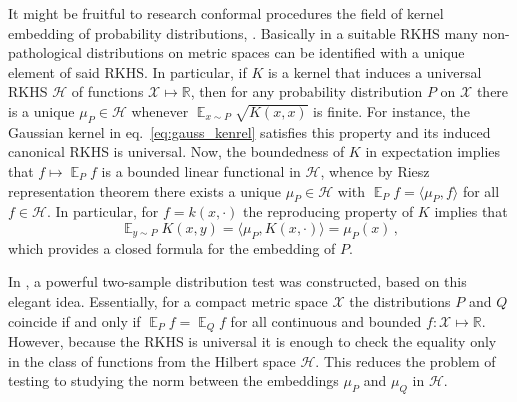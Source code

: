 \documentclass[a4paper,14pt]{extarticle}
\newcommand{\ex}{\mathop{\mathbb{E}}\nolimits}
\newcommand{\Hcal}{\mathcal{H}}
\newcommand{\Xcal}{\mathcal{X}}
\newcommand{\Real}{\mathbb{R}}
\begin{document}
It might be fruitful to research conformal procedures the field of kernel embedding
of probability distributions, \cite{smola2007}. Basically in a suitable RKHS many non-
pathological distributions on metric spaces can be identified with a unique element
of said RKHS. In particular, if $K$ is a kernel that induces a universal RKHS $\Hcal$
of functions $\Xcal\mapsto\Real$, then for any probability distribution $P$ on $\Xcal$
there is a unique $\mu_P\in \Hcal$ whenever $\ex_{x\sim P} \sqrt{K(x,x)}$ is finite.
For instance, the Gaussian kernel in eq.~\ref{eq:gauss_kenrel} satisfies this property
and its induced canonical RKHS is universal. Now, the boundedness of $K$ in expectation
implies that $f\mapsto \ex_P f$ is a bounded linear functional in $\Hcal$, whence by
Riesz representation theorem there exists a unique $\mu_P\in \Hcal$ with $\ex_P f
= \langle \mu_P, f\rangle$ for all $f\in \Hcal$. In particular, for $f = k(x, \cdot)$
the reproducing property of $K$ implies that
\begin{equation*}
  \ex_{y\sim P} K(x, y) = \langle \mu_P, K(x, \cdot) \rangle = \mu_P(x) \,,
\end{equation*}
which provides a closed formula for the embedding of $P$.

In \cite{gretton2012}, a powerful two-sample distribution test was constructed, based
on this elegant idea. Essentially, for a compact metric space $\Xcal$ the distributions
$P$ and $Q$ coincide if and only if $\ex_P f = \ex_Q f$ for all continuous and bounded
$f:\Xcal\mapsto \Real$. However, because the RKHS is universal it is enough to check
the equality only in the class of functions from the Hilbert space $\Hcal$. This
reduces the problem of testing to studying the norm between the embeddings $\mu_P$
and $\mu_Q$ in $\Hcal$.
\end{document}
